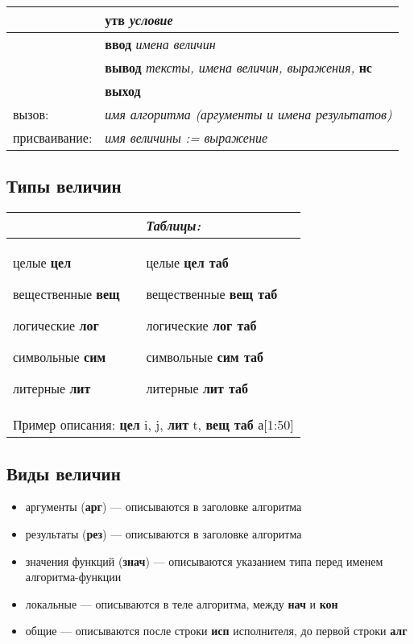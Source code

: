 \documentclass[12pt,a4paper]{article}
\begin{document}
\begin{center}
\begin{tabular}{||l|l||}
\hline
\hline
 & \textbf{утв} \textit{условие}\\
\hline
 & \textbf{ввод} \textit{имена величин}\\
\hline
 & \textbf{вывод} \textit{тексты, имена величин, выражения,} \textbf{нс}\\
\hline
 & \textbf{выход}\\
\hline
\textrm{вызов:} & \textit{имя алгоритма (аргументы и имена результатов)}\\
\hline
\textrm{присваивание:} & \textit{имя величины := выражение}\\
\hline
\hline
\end{tabular}
\end{center}

\normalfont

\subsection{Типы величин}

\begin{center}
\begin{tabular}{||p{5cm}|p{5cm}||}
\hline
\hline
 & \textit{Таблицы:}\\
\hline
целые \textbf{цел} 

вещественные \textbf{вещ} 

логические \textbf{лог} 

символьные \textbf{сим} 

литерные \textbf{лит} &
целые \textbf{цел таб} 

вещественные \textbf{вещ таб} 

логические \textbf{лог таб} 

символьные \textbf{сим таб} 

литерные \textbf{лит таб}\\
\hline
\multicolumn{2}{||c||}{Пример описания: \sffamily \textbf{цел} i, j, \textbf{лит} t, \textbf{вещ таб} а[1:50]}\\
\hline
\hline
\end{tabular}
\end{center}

\subsection{Виды величин}
\begin{itemize}
\item аргументы (\textbf{арг}) --- описываются в заголовке алгоритма 
\item результаты (\textbf{рез}) --- описываются в заголовке алгоритма 
\item значения функций (\textbf{знач}) --- описываются указанием типа перед именем ал\-го\-рит\-ма-функ\-ции
\item локальные --- описываются в теле алгоритма, между \textbf{нач} и \textbf{кон}
\item общие --- описываются после строки \textbf{исп} исполнителя, до первой строки \textbf{алг}
\end{itemize}
\end{document}
